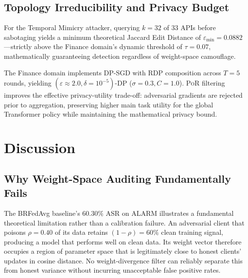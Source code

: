 \documentclass[journal]{IEEEtran}
\newcommand{\por}{\textsc{PoR}}
\begin{document}
\subsection{Topology Irreducibility and Privacy Budget}
\label{sec:finance_privacy}

For the Temporal Mimicry attacker, querying $k=32$ of 33 APIs before
sabotaging yields a minimum theoretical Jaccard Edit Distance of
$\varepsilon_{\min} = 0.0882$---strictly above the Finance domain's dynamic
threshold of $\tau = 0.07$, mathematically guaranteeing detection regardless
of weight-space camouflage.

The Finance domain implements DP-SGD with RDP composition across $T=5$
rounds, yielding $(\varepsilon \approx 2.0, \delta=10^{-5})$-DP
($\sigma=0.3, C=1.0$). \por{} filtering improves the effective privacy-utility
trade-off: adversarial gradients are rejected prior to aggregation, preserving
higher main task utility for the global Transformer policy while maintaining
the mathematical privacy bound.

\section{Discussion}
\label{sec:discussion}

\subsection{Why Weight-Space Auditing Fundamentally Fails}

The BRFedAvg baseline's $60.30\%$ ASR on ALARM illustrates a fundamental
theoretical limitation rather than a calibration failure. An adversarial
client that poisons $\rho = 0.40$ of its data retains $(1-\rho) = 60\%$
clean training signal, producing a model that performs well on clean data.
Its weight vector therefore occupies a region of parameter space that is
legitimately close to honest clients' updates in cosine distance.
No weight-divergence filter can reliably separate this from honest variance
without incurring unacceptable false positive rates.
\end{document}
